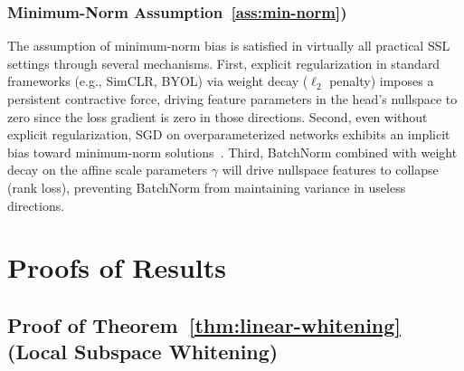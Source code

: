 \documentclass{article}
\theoremstyle{plain}
\theoremstyle{definition}
\theoremstyle{remark}
\begin{document}
\subsubsection{Minimum-Norm Assumption~\ref{ass:min-norm})}
\label{app:min-norm}

The assumption of minimum-norm bias is satisfied in virtually all practical SSL settings through several mechanisms. First, explicit regularization in standard frameworks (e.g., SimCLR, BYOL) via weight decay ($\ell_2$ penalty) imposes a persistent contractive force, driving feature parameters in the head's nullspace to zero since the loss gradient is zero in those directions. Second, even without explicit regularization, SGD on overparameterized networks exhibits an implicit bias toward minimum-norm solutions~\citep{soudry2024implicitbias, gunasekar2019implicitbias}. Third, BatchNorm combined with weight decay on the affine scale parameters $\gamma$ will drive nullspace features to collapse (rank loss), preventing BatchNorm from maintaining variance in useless directions.

\section{Proofs of Results}

\subsection{Proof of Theorem~\ref{thm:linear-whitening} (Local Subspace Whitening)}
\end{document}
